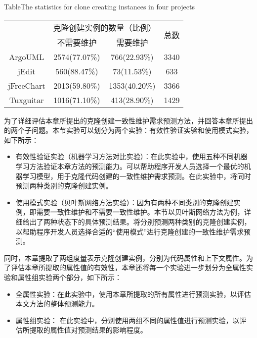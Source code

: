 \begin{table}[htbp]
{Table$\!$}{The statistics for clone creating instances in four projects}
\vspace{0.5em}
\centering
\wuhao
\begin{tabular}{cccc}
\toprule[1.5pt]
~\multirow{2}{*}{实验系统}& \multicolumn{2}{c}{克隆创建实例的数量（比例）} & \multirow{2}{*}{总数}\\ 
 \cline{2-3}
~&{不需要维护} &{需要维护} & ~\\
\midrule[1pt]
ArgoUML&	2574(77.07\%)&	766(22.93\%)&	3340\\
jEdit&	560(88.47\%)&	73(11.53\%)&	633\\
jFreeChart&	2013(59.80\%)&	1353(40.20\%)&	3366\\
Tuxguitar&	1016(71.10\%)&	413(28.90\%)&	1429\\
\bottomrule[1.5pt]
\end{tabular}
\end{table}


为了详细评估本章所提出的克隆创建一致性维护需求预测方法，并回答本章所提出的两个子问题。本节实验可以划分为两个实验：有效性验证实验和使用模式实验，如下所示：
\begin{itemize}
\item
有效性验证实验（机器学习方法对比实验）：在此实验中，使用五种不同机器学习方法验证本章方法的预测能力。可以帮助程序开发人员选择一个最优的机器学习模型，用于克隆代码创建的一致性维护需求预测。在此实验中，将同时预测两种类别的克隆创建实例。
\item
使用模式实验（贝叶斯网络方法实验）：因为有两种不同类别的克隆创建实例，即需要一致性维护和不需要一致性维护。本节以贝叶斯网络方法为例，详细给出了两种状态下的具体预测结果。将分别预测两种类别的克隆创建实例，以帮助程序开发人员选择合适的“使用模式”进行克隆创建的一致性维护需求预测。
\end{itemize}

同时，本章提取了两组度量表示克隆创建实例，分别为代码属性和上下文属性。为了评估本章所提取的属性值的有效性，本章还将每一个实验进一步划分为全属性实验和属性组实验两个部分，如下所示：
\begin{itemize}
\item
全属性实验：在此实验中，使用本章所提取的所有属性进行预测实验，以评估本文方法的整体预测能力。
\item
属性组实验：
在此实验中，分别使用两组不同的属性值进行预测实验，以评估所提取的属性值对预测结果的影响程度。
\end{itemize}

